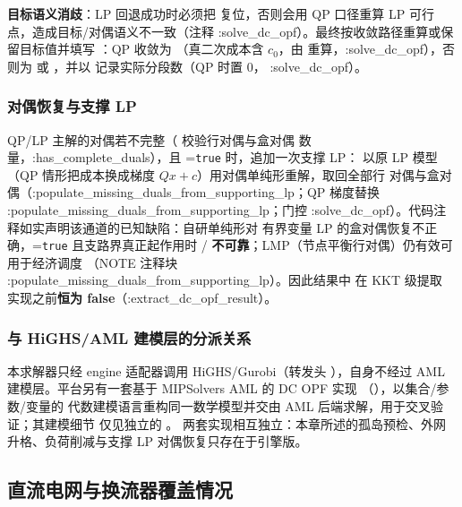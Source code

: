 \textbf{目标语义消歧}：LP 回退成功时必须把  复位，否则会用 QP
口径重算 LP 可行点，造成目标/对偶语义不一致（注释 :solve\_dc\_opf）。最终按收敛路径重算或保留目标值并填写
：QP 收敛为 （真二次成本含 $c_0$，由
 重算，:solve\_dc\_opf），否则为 
或 ，并以  记录实际分段数（QP 时置 0，
:solve\_dc\_opf）。

\subsubsection*{对偶恢复与支撑 LP}
QP/LP 主解的对偶若不完整（ 校验行对偶与盒对偶
数量，:has\_complete\_duals），且 =\texttt{true} 时，追加一次支撑 LP：
以原 LP 模型（QP 情形把成本换成梯度 $Qx+c$）用对偶单纯形重解，取回全部行
对偶与盒对偶（:populate\_missing\_duals\_from\_supporting\_lp；QP 梯度替换
:populate\_missing\_duals\_from\_supporting\_lp；门控 :solve\_dc\_opf）。代码注释如实声明该通道的已知缺陷：自研单纯形对
有界变量 LP 的盒对偶恢复不正确，=\texttt{true}
且支路界真正起作用时 /
\textbf{不可靠}；LMP（节点平衡行对偶）仍有效可用于经济调度
（NOTE 注释块 :populate\_missing\_duals\_from\_supporting\_lp）。因此结果中  在 KKT 级提取
实现之前\textbf{恒为 false}（:extract\_dc\_opf\_result）。

\subsubsection*{与 HiGHS/AML 建模层的分派关系}
本求解器只经 engine 适配器调用 HiGHS/Gurobi（转发头
），自身不经过
AML 建模层。平台另有一套基于 MIPSolvers AML 的 DC OPF 实现
（），以集合/参数/变量的
代数建模语言重构同一数学模型并交由 AML 后端求解，用于交叉验证；其建模细节
仅见独立的 。
两套实现相互独立：本章所述的孤岛预检、外网
升格、负荷削减与支撑 LP 对偶恢复只存在于引擎版。

\subsection{直流电网与换流器覆盖情况}\label{subsec:dcopf-dcgrid}

